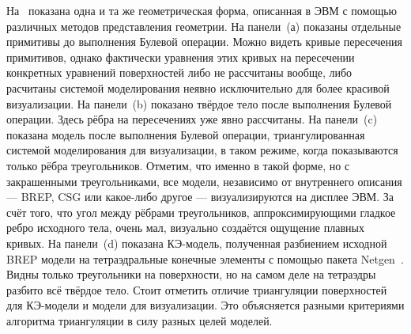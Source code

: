На~ показана одна и та же геометрическая форма, описанная в ЭВМ с помощью различных методов представления геометрии.
На панели~(а) показаны отдельные примитивы до выполнения Булевой операции. Можно видеть кривые пересечения примитивов, однако фактически уравнения этих кривых на пересечении конкретных уравнений поверхностей либо не рассчитаны вообще, либо расчитаны системой моделирования неявно исключительно для более красивой визуализации.
На панели~(b) показано твёрдое тело после выполнения Булевой операции. Здесь рёбра на пересечениях уже явно рассчитаны.
На панели~(c) показана модель после выполнения Булевой операции, триангулированная системой моделирования для визуализации, в таком режиме, когда показываются только рёбра треугольников. Отметим, что именно в такой форме, но с закрашенными треугольниками, все модели, независимо от внутреннего описания --- BREP, CSG или какое-либо другое --- визуализируются на дисплее ЭВМ. За счёт того, что угол между рёбрами треугольников, аппроксимирующими гладкое ребро исходного тела, очень мал, визуально создаётся ощущение плавных кривых.
На панели~(d) показана КЭ-модель, полученная разбиением исходной BREP модели на тетраэдральные конечные элементы с помощью пакета Netgen~\cite{NETGEN}. Видны только треугольники на поверхности, но на самом деле на тетраэдры разбито всё твёрдое тело.
Стоит отметить отличие триангуляции поверхностей для КЭ-модели и модели для визуализации. Это объясняется разными критериями алгоритма триангуляции в силу разных целей моделей.

